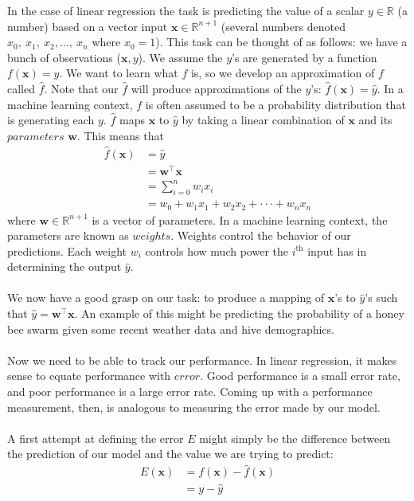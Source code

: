 \documentclass[a4paper]{article}
\begin{document}
\noindent In the case of linear regression the task is predicting the value of a scalar $y \in \mathbb{R}$ (a number) based on a vector input $\bm{x}\in \mathbb{R}^{n+1}$ (several numbers denoted $x_0,\ x_1,\ x_2,...,\ x_n$ where $x_0 = 1$). This task can be thought of as follows: we have a bunch of observations ($\bm{x}, y$). We assume the $y$'s are generated by a function $f(\bm{x})=y$. We want to learn what $f$ is, so we develop an approximation of $f$ called $\hat{f}$. Note that our $\hat{f}$ will produce approximations of the $y$'s: $\hat{f}(\bm{x}) = \hat{y}$. In a machine learning context, $f$ is often assumed to be a probability distribution that is generating each $y$. $\hat{f}$ maps $\bm{x}$ to $\hat{y}$ by taking a linear combination of $\bm{x}$ and its $parameters$ $\bm{w}$. This means that 
\begin{align*}
\hat{f}(\bm{x}) &= \hat{y} \\
&= \bm{w}^{\intercal} \bm{x} \\
&= \sum_{i = 0}^n w_i x_i \\
&= w_0 + w_1 x_1 + w_2 x_2 + \cdot \cdot \cdot + w_n x_n
\end{align*} 
\noindent where $\bm{w} \in \mathbb{R}^{n+1}$ is a vector of parameters. In a machine learning context, the parameters are known as $weights$. Weights control the behavior of our predictions. Each weight $w_i$ controls how much power the $i^{\mathrm{th}}$ input has in determining the output $\hat{y}$. 
\\ \\
\noindent We now have a good grasp on our task: to produce a mapping of $\bm{x}$'s to $\hat{y}$'s such that $\hat{y} = \bm{w}^{\intercal} \bm{x}$. An example of this might be predicting the probability of a honey bee swarm given some recent weather data and hive demographics. 
\\ \\
\noindent Now we need to be able to track our performance. In linear regression, it makes sense to equate performance with $error$. Good performance is a small error rate, and poor performance is a large error rate. Coming up with a performance measurement, then, is analogous to measuring the error made by our model. 
\\ \\
\noindent A first attempt at defining the error $E$ might simply be the difference between the prediction of our model and the value we are trying to predict:
\begin{align*}
E(\bm{x}) &= f(\bm{x}) - \hat{f}(\bm{x}) \\
&= y - \hat{y}
\end{align*}
\end{document}
